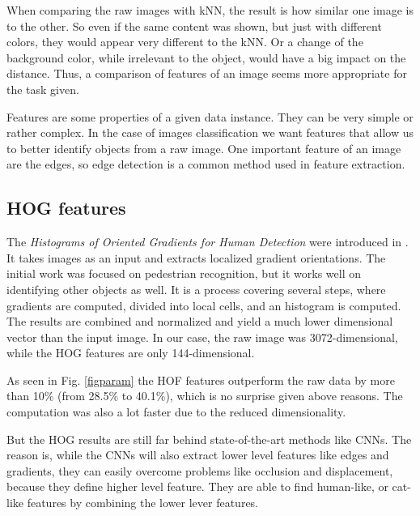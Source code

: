 When comparing the raw images with kNN, the result is how similar one image is to the other. So even if the same content was shown, but just with different colors, they would appear very different to the kNN. Or a change of the background color, while irrelevant to the object, would have a big impact on the distance. Thus, a comparison of features of an image seems more appropriate for the task given. 

Features are some properties of a given data instance. They can be very simple or rather complex. In the case of images classification we want features that allow us to better identify objects from a raw image. One important feature of an image are the edges, so edge detection is a common method used in feature extraction. 

\subsection{HOG features}
The \emph{Histograms of Oriented Gradients for Human Detection} were introduced in  \cite{Dalal:2005:HOG:1068507.1069007}. It takes images as an input and extracts localized gradient orientations. The initial work was focused on pedestrian recognition, but it works well on identifying other objects as well. It is a process covering several steps, where gradients are computed, divided into local cells, and an histogram is computed. The results are combined and normalized and yield a much lower dimensional vector than the input image. In our case, the raw image was 3072-dimensional, while the HOG features are only 144-dimensional. 

As seen in Fig. \ref{figparam} the HOF features outperform the raw data by more than 10\% (from 28.5\% to 40.1\%), which is no surprise given above reasons. The computation was also a lot faster due to the reduced dimensionality.

But the HOG results are still far behind state-of-the-art methods like CNNs. The reason is, while the CNNs will also extract lower level features like edges and gradients, they can easily overcome problems like occlusion and displacement, because they define higher level feature. They are able to find human-like, or cat-like features by combining the lower lever features. 




